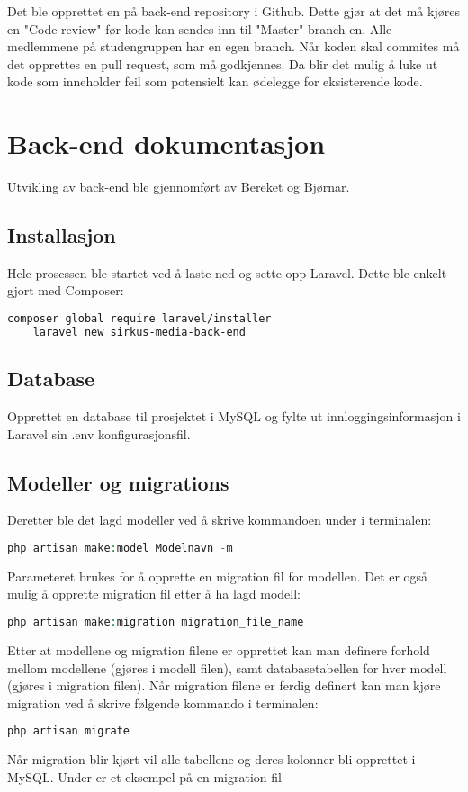 Det ble opprettet en  på back-end repository i Github. Dette gjør at det må kjøres en "Code review" før kode kan sendes inn til "Master" branch-en. Alle medlemmene på studengruppen har en egen branch.
Når koden skal commites må det opprettes en pull request, som må godkjennes. Da blir det mulig å luke ut kode som inneholder feil som potensielt kan ødelegge for eksisterende kode.

\section{Back-end dokumentasjon}
Utvikling av back-end ble gjennomført av Bereket og Bjørnar. 

\subsection{Installasjon}
Hele prosessen ble startet ved å laste ned og sette opp Laravel.
Dette ble enkelt gjort med Composer:
\begin{lstlisting}[caption={Installasjon av Laravel med Composer},language=bash]
    composer global require laravel/installer
    laravel new sirkus-media-back-end
\end{lstlisting}

\subsection{Database}
Opprettet en database til prosjektet i MySQL og fylte ut innloggingsinformasjon i Laravel sin .env konfigurasjonsfil. 

\subsection{Modeller og migrations}
Deretter ble det lagd modeller ved å skrive kommandoen under i terminalen: 
\begin{lstlisting}[caption={Laravel Artisan kommando for oppretting av modell og migration},language=php]
    php artisan make:model Modelnavn -m
\end{lstlisting}
Parameteret  brukes for å opprette en migration fil for modellen. Det er også mulig å opprette migration fil etter å ha lagd modell: 
\begin{lstlisting}[caption={Laravel Artisan kommando for oppretting av migration fil},language=php]
    php artisan make:migration migration_file_name
\end{lstlisting}
Etter at modellene og migration filene er opprettet kan man definere forhold mellom modellene (gjøres i modell filen), samt databasetabellen for hver modell (gjøres i migration filen).
Når migration filene er ferdig definert kan man kjøre migration ved å skrive følgende kommando i terminalen:
\begin{lstlisting}[caption={Laravel Artisan kommando for å kjøre migration},language=php]
    php artisan migrate
\end{lstlisting}
Når migration blir kjørt vil alle tabellene og deres kolonner bli opprettet i MySQL.
Under er et eksempel på en migration fil


